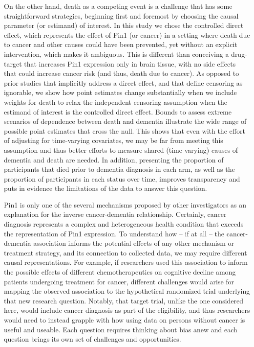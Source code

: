 \documentclass[
]{book}
\begin{document}
On the other hand, death as a competing event is a challenge that has some straightforward strategies, beginning first and foremost by choosing the causal parameter (or estimand) of interest\autocite[\textcite{rojas_medrxiv}]{young2020}. In this study we chose the controlled direct effect, which represents the effect of Pin1 (or cancer) in a setting where death due to cancer and other causes could have been prevented, yet without an explicit intervention, which makes it ambiguous. This is different than conceiving a drug-target that increases Pin1 expression only in brain tissue, with no side effects that could increase cancer risk (and thus, death due to cancer). As opposed to prior studies that implicitly address a direct effect, and that define censoring as ignorable\autocite{frain2017}, we show how point estimates change substantially when we include weights for death to relax the independent censoring assumption\autocite[\textcite{vangeloven2014}, \textcite{willems2018}, \textcite{young2020}]{weuve2012} when the estimand of interest is the controlled direct effect. Bounds to assess extreme scenarios of dependence between death and dementia\autocite{peterson1976} illustrate the wide range of possible point estimates that cross the null. This shows that even with the effort of adjusting for time-varying covariates, we may be far from meeting this assumption and thus better efforts to measure shared (time-varying) causes of dementia and death are needed. In addition, presenting the proportion of participants that died prior to dementia diagnosis in each arm, as well as the proportion of participants in each status over time, improves transparency and puts in evidence the limitations of the data to answer this question.

Pin1 is only one of the several mechanisms proposed by other investigators as an explanation for the inverse cancer-dementia relationship. Certainly, cancer diagnosis represents a complex and heterogeneous health condition that exceeds the representation of Pin1 expression. To understand how -- if at all -- the cancer-dementia association informs the potential effects of any other mechanism or treatment strategy, and its connection to collected data, we may require different causal representations. For example, if researchers used this association to inform the possible effects of different chemotherapeutics on cognitive decline among patients undergoing treatment for cancer, different challenges would arise for mapping the observed association to the hypothetical randomized trial underlying that new research question. Notably, that target trial, unlike the one considered here, would include cancer diagnosis as part of the eligibility, and thus researchers would need to instead grapple with how using data on persons without cancer is useful and useable\autocite{huitfeldt2016}.
Each question requires thinking about bias anew and each question brings its own set of challenges and opportunities.
\end{document}
